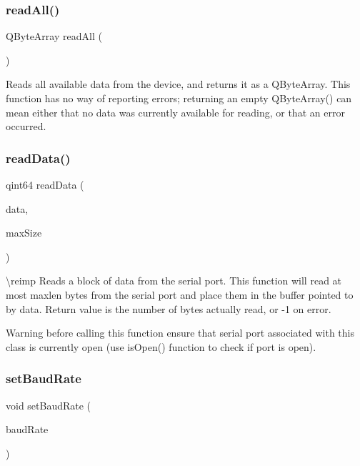 \subsubsection{\texorpdfstring{readAll()}{readAll()}}
{\footnotesize\ttfamily Q\+Byte\+Array read\+All (\begin{DoxyParamCaption}{ }\end{DoxyParamCaption})}

Reads all available data from the device, and returns it as a Q\+Byte\+Array. This function has no way of reporting errors; returning an empty Q\+Byte\+Array() can mean either that no data was currently available for reading, or that an error occurred. \mbox{\label{class_qext_serial_port_a7b663c8cce06efc774d5d3f9fa40ff6e}} 
\subsubsection{\texorpdfstring{readData()}{readData()}}
{\footnotesize\ttfamily qint64 read\+Data (\begin{DoxyParamCaption}\item[{char $\ast$}]{data,  }\item[{qint64}]{max\+Size }\end{DoxyParamCaption})\hspace{0.3cm}{\ttfamily [protected]}}

\textbackslash{}reimp Reads a block of data from the serial port. This function will read at most maxlen bytes from the serial port and place them in the buffer pointed to by data. Return value is the number of bytes actually read, or -\/1 on error.

\begin{DoxyWarning}{Warning}
before calling this function ensure that serial port associated with this class is currently open (use is\+Open() function to check if port is open). 
\end{DoxyWarning}
\mbox{\label{class_qext_serial_port_a4e1e8a8bd23ec4a70b6fd9ce4cda322d}} 
\subsubsection{\texorpdfstring{setBaudRate}{setBaudRate}}
{\footnotesize\ttfamily void set\+Baud\+Rate (\begin{DoxyParamCaption}\item[{Baud\+Rate\+Type}]{baud\+Rate }\end{DoxyParamCaption})\hspace{0.3cm}{\ttfamily [slot]}}

